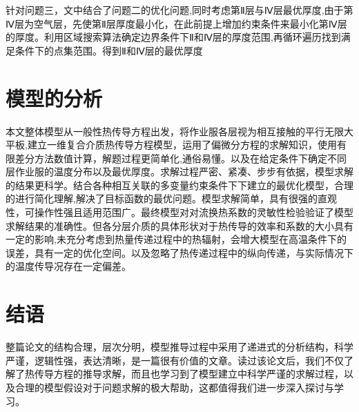 \documentclass{whutmod}
\begin{document}
针对问题三，文中结合了问题二的优化问题,同时考虑第Ⅱ层与Ⅳ层最优厚度,由于第Ⅳ层为空气层，先使第Ⅱ层厚度最小化，在此前提上增加约束条件来最小化第Ⅳ层的厚度。利用区域搜索算法确定边界条件下Ⅱ和Ⅳ层的厚度范围,再循环遍历找到满足条件下的点集范围。得到Ⅱ和Ⅳ层的最优厚度


\section{模型的分析}
本文整体模型从一般性热传导方程出发，将作业服各层视为相互接触的平行无限大平板,建立一维复合介质热传导方程模型，运用了偏微分方程的求解知识，使用有限差分方法数值计算，解题过程更简单化,通俗易懂。以及在给定条件下确定不同层作业服的温度分布以及最优厚度。求解过程严密、紧凑、步步有依据，模型求解的结果更科学。结合各种相互关联的多变量约束条件下下建立的最优化模型，合理的进行简化理解,解决了目标函数的最优问题。模型求解简单，具有很强的直观性，可操作性强且适用范围广。最终模型对对流换热系数的灵敏性检验验证了模型求解结果的准确性。但各分层介质的具体形状对于热传导的效率和系数的大小具有一定的影响,未充分考虑到热量传递过程中的热辐射，会增大模型在高温条件下的误差，具有一定的优化空间。以及忽略了热传递过程中的纵向传递，与实际情况下的温度传导况存在一定偏差。


\section{结语}
整篇论文的结构合理，层次分明，模型推导过程中采用了递进式的分析结构，科学严谨，逻辑性强，表达清晰，是一篇很有价值的文章。读过该论文后，我们不仅了解了热传导方程的推导求解，而且也学习到了模型建立中科学严谨的求解过程，以及合理的模型假设对于问题求解的极大帮助，这都值得我们进一步深入探讨与学习。
\end{document}
